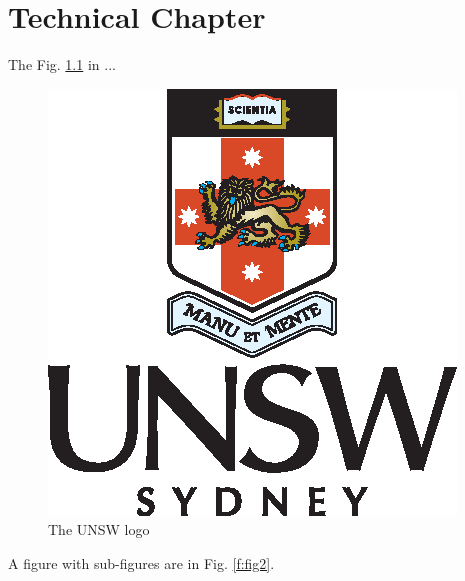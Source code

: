 \chapter[Tech chapter]{Technical Chapter} \label{c:tc3} 

The Fig. \ref{f:fig1} in ...

\begin{figure}[!ht]
\centering
\includegraphics[width=0.4\linewidth]{unswlogo.eps}
\caption{The UNSW logo}
\label{f:fig1}
\end{figure}


A figure with sub-figures are in Fig. \ref{f:fig2}.


